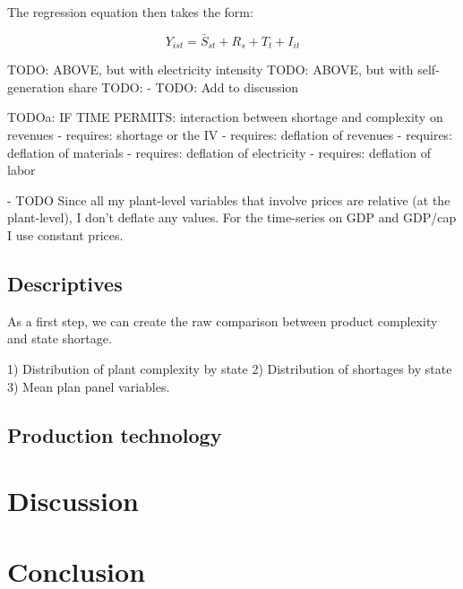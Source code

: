 \documentclass[11pt]{article}
\begin{document}
The regression equation then takes the form:

\[
	Y_{ist} = \bar{S}_{st} + R_{s} + T_{t} + I_{it} 
\]



TODO: ABOVE, but with electricity intensity
TODO: ABOVE, but with self-generation share
TODO: 
 - TODO: Add to discussion

TODOa: IF TIME PERMITS: interaction between shortage and complexity on revenues - requires: shortage or the IV
 - requires: deflation of revenues
 - requires: deflation of materials
 - requires: deflation of electricity
 - requires: deflation of labor

 - TODO Since all my plant-level variables that involve prices are relative (at the plant-level), I don't deflate any values. For the time-series on GDP and GDP/cap I use constant prices.



\subsection{Descriptives}%
\label{sub:descriptives}

As a first step, we can create the raw comparison between product complexity and state shortage.

1) Distribution of plant complexity by state
2) Distribution of shortages by state
3) Mean plan panel variables.

\subsection{Production technology}%
\label{sub:production_technology}


\newpage

\section{Discussion}%
\label{sec:discussion}


\newpage

\section{Conclusion}%
\label{sec:conclusion}
\end{document}
